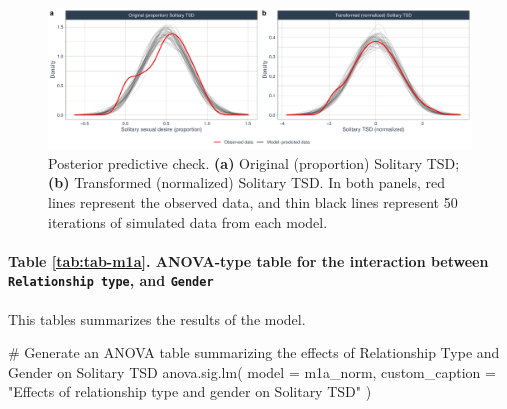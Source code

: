 \documentclass[
  bookmarksnumbered]{article}
\newenvironment{Shaded}{\begin{snugshade}}{\end{snugshade}}
\newcommand{\AttributeTok}[1]{\textcolor[rgb]{0.80,0.80,0.80}{#1}}
\newcommand{\CommentTok}[1]{\textcolor[rgb]{0.50,0.62,0.50}{#1}}
\newcommand{\FunctionTok}[1]{\textcolor[rgb]{0.94,0.94,0.56}{#1}}
\newcommand{\NormalTok}[1]{\textcolor[rgb]{0.80,0.80,0.80}{#1}}
\newcommand{\StringTok}[1]{\textcolor[rgb]{0.80,0.58,0.58}{#1}}
\begin{document}
\begin{figure}
\centering
\includegraphics{Sexual_Desire_Arousal_anonymous_files/figure-latex/ppc-m1a-1.pdf}
\caption{\label{fig:ppc-m1a}Posterior predictive check. \textbf{(a)} Original (proportion) Solitary TSD; \textbf{(b)} Transformed (normalized) Solitary TSD. In both panels, red lines represent the observed data, and thin black lines represent 50 iterations of simulated data from each model.}
\end{figure}

\paragraph{\texorpdfstring{Table \ref{tab:tab-m1a}. ANOVA-type table for the interaction between \texttt{Relationship\ type}, and \texttt{Gender}}{Table \ref{tab:tab-m1a}. ANOVA-type table for the interaction between Relationship type, and Gender}}\label{table-reftabtab-m1a.-anova-type-table-for-the-interaction-between-relationship-type-and-gender}

This tables summarizes the results of the model.

\begin{Shaded}
\begin{Highlighting}[]
\CommentTok{\# Generate an ANOVA table summarizing the effects of Relationship Type and Gender on Solitary TSD}
\FunctionTok{anova.sig.lm}\NormalTok{(}
  \AttributeTok{model =}\NormalTok{ m1a\_norm,}
  \AttributeTok{custom\_caption =} \StringTok{"Effects of relationship type and gender on Solitary TSD"}
\NormalTok{)}
\end{Highlighting}
\end{Shaded}
\end{document}
